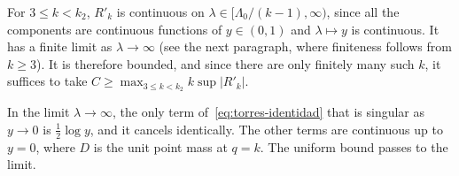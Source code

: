 For $3\le k<k_2$, $R'_k$ is continuous on $\lambda\in[\Lambda_0/(k-1),\infty)$, since all the components are
continuous functions of $y\in(0,1)$ and $\lambda\mapsto y$ is continuous. It has a finite limit as
$\lambda\to\infty$ (see the next paragraph, where finiteness follows from $k\ge3$). It is therefore bounded,
and since
there are only finitely many such $k$, it suffices to take $C\ge\max_{3\le k<k_2}k\sup|R'_k|$.

In the limit $\lambda\to\infty$, the only term of~\eqref{eq:torres-identidad} that is singular as
$y\to0$ is $\frac12\log y$, and it cancels identically. The other terms are continuous up to $y=0$, where
$D$ is the
unit point mass at $q=k$. The uniform bound passes to the limit.
